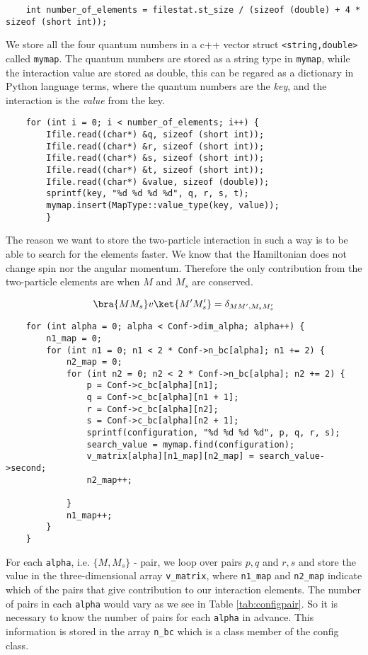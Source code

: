 \begin{lstlisting}
    int number_of_elements = filestat.st_size / (sizeof (double) + 4 * sizeof (short int));
\end{lstlisting}
%
We store all the four quantum numbers in a c++ vector struct \texttt{<string,double>} called \texttt{mymap}. The quantum numbers are stored as a string type in \texttt{mymap}, while the interaction value are stored as double, this can be regared as a dictionary in Python language terms, where the quantum numbers are the \emph{key}, and the interaction is the \emph{value} from the key.  
\begin{lstlisting}
    for (int i = 0; i < number_of_elements; i++) {
        Ifile.read((char*) &q, sizeof (short int));
        Ifile.read((char*) &r, sizeof (short int));
        Ifile.read((char*) &s, sizeof (short int));
        Ifile.read((char*) &t, sizeof (short int));
        Ifile.read((char*) &value, sizeof (double));
        sprintf(key, "%d %d %d %d", q, r, s, t);
        mymap.insert(MapType::value_type(key, value));
        }
\end{lstlisting}
%
The reason we want to store the two-particle interaction in such a way is to be able to search for the elements faster. We know that the Hamiltonian does not change spin nor the angular momentum. Therefore the only contribution from the two-particle elements are when $M$ and $M_s$ are conserved. 

\begin{equation}
  \bra{M M_s}v\ket{M' M_s'} = \delta_{MM',M_s M_s'}
\end{equation}
%
\begin{lstlisting}
    for (int alpha = 0; alpha < Conf->dim_alpha; alpha++) {
        n1_map = 0;
        for (int n1 = 0; n1 < 2 * Conf->n_bc[alpha]; n1 += 2) {
            n2_map = 0;
            for (int n2 = 0; n2 < 2 * Conf->n_bc[alpha]; n2 += 2) {
            	p = Conf->c_bc[alpha][n1];
            	q = Conf->c_bc[alpha][n1 + 1];
            	r = Conf->c_bc[alpha][n2];
            	s = Conf->c_bc[alpha][n2 + 1];
                sprintf(configuration, "%d %d %d %d", p, q, r, s);
                search_value = mymap.find(configuration);
                v_matrix[alpha][n1_map][n2_map] = search_value->second;
                n2_map++;

            }
            n1_map++;
        }
    }
\end{lstlisting}
%
For each \texttt{alpha}, i.e. $\{M, M_s\}$ - pair, we loop over pairs $p,q$ and $r,s$ and store the value in the three-dimensional array \texttt{v\_matrix}, where \texttt{n1\_map} and \texttt{n2\_map} indicate which of the pairs that give contribution to our interaction elements. The number of pairs in each \texttt{alpha} would vary as we see in Table \ref{tab:configpair}. So it is necessary to know the number of pairs for each \texttt{alpha} in advance. This information is stored in the array \texttt{n\_bc} which is a class member of the config class. 

